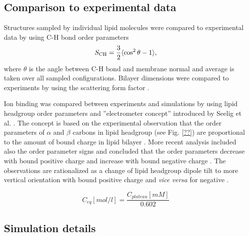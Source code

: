 \documentclass[aip,jcp,twocolumn]{revtex4}
\begin{document}
\subsection{Comparison to experimental data}
Structures sampled by individual lipid molecules were compared
to experimental data by using C-H bond order parameters \cite{ollila16}
\begin{equation}
S_{\rm CH}=\frac{3}{2}\langle \cos^2\theta -1 \rangle,
\end{equation}
where $\theta$ is the angle between C-H bond and membrane
normal and average is taken over all sampled configurations.
Bilayer dimensions were compared to experiments by using the
scattering form factor \cite{ollila16}
. 

Ion binding was compared between experiments and simulations by 
using lipid headgroup order parameters and ''electrometer concept'' 
introduced by Seelig et al. \cite{seelig87,catte16}.
The concept is based on the experimental observation that the 
order parameters of $\alpha$ and $\beta$ carbons in lipid headgroup
(see Fig. \ref{??}) are proportional to the amount of bound charge
in lipid bilayer \cite{seelig87}. More recent analysis included also
the order parameter signs and concluded that the order parameters  
decrease with bound positive charge and increase with bound negative 
charge \cite{ollila16,catte16}. The observations are rationalized 
as a change of lipid headgroup dipole tilt to more vertical orientation
with bound positive charge and {\it vice versa} for negative \cite{seelig87}. 

\begin{equation}
  C_{eq}[mol/l]=\frac{C_{plateau}[mM]}{0.602}
\end{equation}


\subsection{Simulation details}
\end{document}
